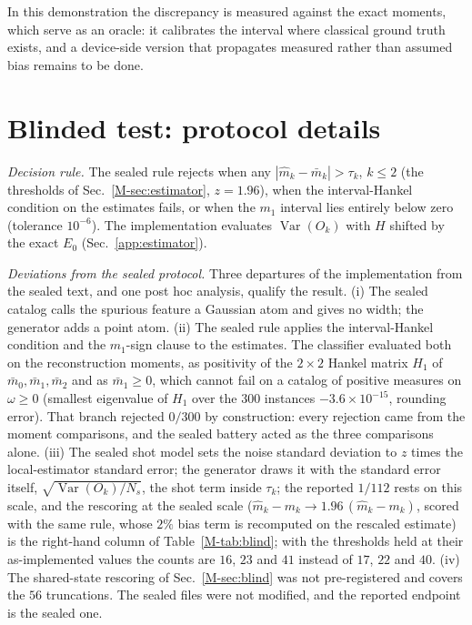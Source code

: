 \documentclass[aps,prb,onecolumn,superscriptaddress,longbibliography,floatfix]{revtex4-2}
\begin{document}
In this demonstration the discrepancy is measured against the exact moments, which serve as an oracle: it calibrates the interval where classical ground truth exists, and a device-side version that propagates measured rather than assumed bias remains to be done.

\section{Blinded test: protocol details}
\label{app:blinddetails}
\emph{Decision rule.} The sealed rule rejects when any $|\widehat m_k-\bar m_k|>\tau_k$, $k\le2$ (the thresholds of Sec.~\ref{M-sec:estimator}, $z=1.96$), when the interval-Hankel condition on the estimates fails, or when the $m_1$ interval lies entirely below zero (tolerance $10^{-6}$). The implementation evaluates $\operatorname{Var}(O_k)$ with $H$ shifted by the exact $E_0$ (Sec.~\ref{app:estimator}).

\emph{Deviations from the sealed protocol.} Three departures of the implementation from the sealed text, and one post hoc analysis, qualify the result. (i) The sealed catalog calls the spurious feature a Gaussian atom and gives no width; the generator adds a point atom. (ii) The sealed rule applies the interval-Hankel condition and the $m_1$-sign clause to the estimates. The classifier evaluated both on the reconstruction moments, as positivity of the $2\times2$ Hankel matrix $H_1$ of $\bar m_0,\bar m_1,\bar m_2$ and as $\bar m_1\ge0$, which cannot fail on a catalog of positive measures on $\omega\ge0$ (smallest eigenvalue of $H_1$ over the $300$ instances $-3.6\times10^{-15}$, rounding error). That branch rejected $0/300$ by construction: every rejection came from the moment comparisons, and the sealed battery acted as the three comparisons alone. (iii) The sealed shot model sets the noise standard deviation to $z$ times the local-estimator standard error; the generator draws it with the standard error itself, $\sqrt{\operatorname{Var}(O_k)/N_s}$, the shot term inside $\tau_k$; the reported $1/112$ rests on this scale, and the rescoring at the sealed scale ($\widehat m_k-m_k\to1.96\,(\widehat m_k-m_k)$, scored with the same rule, whose $2\%$ bias term is recomputed on the rescaled estimate) is the right-hand column of Table~\ref{M-tab:blind}; with the thresholds held at their as-implemented values the counts are $16$, $23$ and $41$ instead of $17$, $22$ and $40$. (iv) The shared-state rescoring of Sec.~\ref{M-sec:blind} was not pre-registered and covers the $56$ truncations. The sealed files were not modified, and the reported endpoint is the sealed one.
\end{document}
